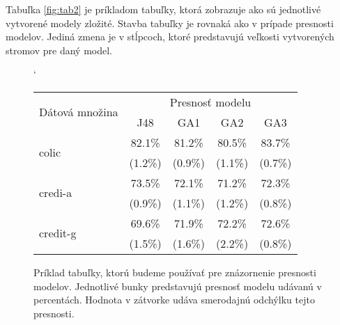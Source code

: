 Tabuľka \ref{fig:tab2} je príkladom tabuľky, ktorá zobrazuje ako sú jednotlivé vytvorené modely zložité. Stavba tabuľky je rovnaká ako v prípade presnosti modelov. Jediná zmena je v stĺpcoch, ktoré predstavujú veľkosti vytvorených stromov pre daný model.

\renewcommand{\figurename}{Tabuľka}
\begin{figure}[h]
\catcode`
\centering 
\newcommand\T{\rule{0pt}{2.6ex}}       %
\newcommand\B{\rule[-1.2ex]{0pt}{0pt}} %
\begin{tabular}{|l||c|c|c|c||}
\hline \multirow{2}{*}{Dátová množina} & \multicolumn{4}{|c||}{Presnosť modelu} \\ 
\cline{2-5} & J48 & GA1 & GA2 & GA3 \\
\hline
\hline \multirow{2}{*}{colic} & 82.1\% & 81.2\% & 80.5\% & 83.7\% \T\\[-1.5ex]
& \tiny (1.2\%) & \tiny (0.9\%) & \tiny (1.1\%) & \tiny (0.7\%)\B\\
\hline \multirow{2}{*}{credi-a} & 73.5\% & 72.1\% & 71.2\% & 72.3\% \T\\[-1.5ex]
& \tiny (0.9\%) & \tiny (1.1\%) & \tiny (1.2\%) & \tiny (0.8\%)\B\\
\hline \multirow{2}{*}{credit-g} & 69.6\% & 71.9\% & 72.2\% & 72.6\% \T\\[-1.5ex]
& \tiny (1.5\%) & \tiny (1.6\%) & \tiny (2.2\%) & \tiny (0.8\%)\B\\
\hline
\end{tabular}
\caption{Príklad tabuľky, ktorú budeme používať pre znázornenie presnosti modelov. Jednotlivé bunky predstavujú presnosť modelu udávanú v percentách. Hodnota v zátvorke udáva smerodajnú odchýlku tejto presnosti.}\label{fig:tab1}
\end{figure}



